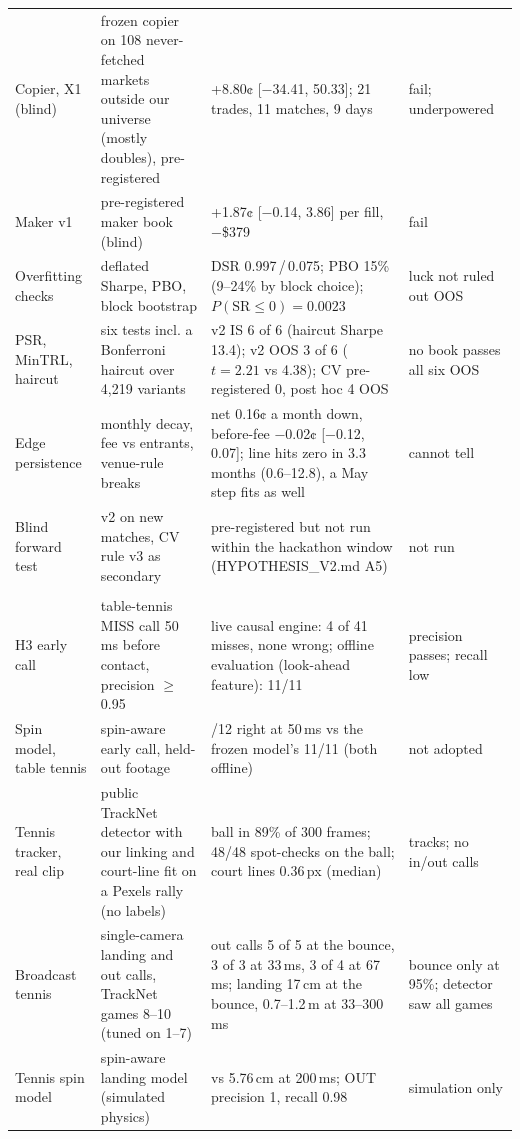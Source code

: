 \documentclass[11pt,letterpaper]{article}
\begin{document}
{\begin{longtable}{@{}>{\raggedright\arraybackslash}p{1.12in}>{\raggedright\arraybackslash}p{1.72in}>{\raggedright\arraybackslash}p{2.4in}>{\raggedright\arraybackslash}p{0.92in}@{}}
Copier, X1 (blind) & frozen copier on 108 never-fetched markets outside our universe (mostly doubles), pre-registered & +8.80¢ [−34.41, 50.33]; 21 trades, 11 matches, 9 days & fail; underpowered \\
Maker v1 & pre-registered maker book (blind) & +1.87¢ [−0.14, 3.86] per fill, −\$379 & fail \\
Overfitting checks & deflated Sharpe, PBO, block bootstrap & DSR 0.997\,/\,0.075; PBO 15\% (9–24\% by block choice); $P(\text{SR}\leq 0) = 0.0023$ & luck not ruled out OOS \\
PSR, MinTRL, haircut & six tests incl. a Bonferroni haircut over 4,219 variants & v2 IS 6 of 6 (haircut Sharpe 13.4); v2 OOS 3 of 6 ($t = 2.21$ vs 4.38); CV pre-registered 0, post hoc 4 OOS & no book passes all six OOS \\
Edge persistence & monthly decay, fee vs entrants, venue-rule breaks & net 0.16¢ a month down, before-fee −0.02¢ [−0.12, 0.07]; line hits zero in 3.3 months (0.6–12.8), a May step fits as well & cannot tell \\
Blind forward test & v2 on new matches, CV rule v3 as secondary & pre-registered but not run within the hackathon window (HYPOTHESIS\_V2.md A5) & not run \\
\multicolumn{4}{@{}l}{\emph{Being fast ourselves (computer vision)}} \\
H3 early call & table-tennis MISS call 50\,ms before contact, precision $\geq$0.95 & live causal engine: 4 of 41 misses, none wrong; offline evaluation (look-ahead feature): 11/11 & precision passes; recall low \\
Spin model, table tennis & spin-aware early call, held-out footage & 10/12 right at 50\,ms vs the frozen model's 11/11 (both offline) & not adopted \\
Tennis tracker, real clip & public TrackNet detector with our linking and court-line fit on a Pexels rally (no labels) & ball in 89\% of 300 frames; 48/48 spot-checks on the ball; court lines 0.36\,px (median) & tracks; no in/out calls \\
Broadcast tennis & single-camera landing and out calls, TrackNet games 8--10 (tuned on 1--7) & out calls 5 of 5 at the bounce, 3 of 3 at 33\,ms, 3 of 4 at 67\,ms; landing 17\,cm at the bounce, 0.7–1.2\,m at 33--300\,ms & bounce only at 95\%; detector saw all games \\
Tennis spin model & spin-aware landing model (simulated physics) & 0.57 vs 5.76\,cm at 200\,ms; OUT precision 1, recall 0.98 & simulation only \\

\end{longtable}}
\end{document}
